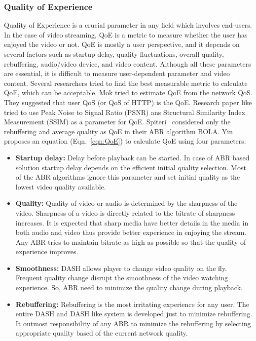 \subsubsection{Quality of Experience}
Quality of Experience is a crucial parameter in any field which involves end-users. In the case of video streaming, QoE is a metric to measure whether the user has enjoyed the video or not. QoE is mostly a user perspective, and it depends on several factors such as startup delay, quality fluctuations, overall quality, rebuffering, audio/video device, and video content. Although all these parameters are essential, it is difficult to measure user-dependent parameter and video content. Several researchers tried to find the best measurable metric to calculate QoE, which can be acceptable. Mok \etal \cite{5990550} tried to estimate QoE from the network QoS. They suggested that user QoS (or QoS of HTTP) is the QoE. Research paper like \cite{} tried to use Peak Noise to Signal Ratio (PSNR) ans Structural Similarity Index Measurement (SSIM) as a parameter for QoE. Spiteri \etal\ considered only the rebuffering and average quality as QoE in their ABR algorithm BOLA\cite{7524428}. Yin \etal\cite{10.1145/2785956.2787486} proposes an equation (Eqn.~\ref{eqn:QoE}) to calculate QoE using four parameters:
\begin{itemize}
	\item {\bf Startup delay:} Delay before playback can be started. In case of ABR based solution startup delay depends on the efficient initial quality selection. Most of the ABR algorithms ignore this parameter and set initial quality as the lowest video quality available.
	\item {\bf Quality:} Quality of video or audio is determined by the sharpness of the video. Sharpness of a video is directly related to the bitrate of sharpness increases. It is expected that sharp media have better details in the media in both audio and video thus provide better experience in enjoying the stream. Any ABR tries to maintain bitrate as high as possible so that the quality of experience improves.
	\item {\bf Smoothness:} DASH allows player to change video quality on the fly. Frequent quality change disrupt the smoothness of the video watching experience. So, ABR need to minimize the quality change during playback.
	\item {\bf Rebuffering:} Rebuffering is the most irritating experience for any user. The entire DASH and DASH like system is developed just to minimize rebuffering. It outmost responsibility of any ABR to minimize the rebuffering by selecting appropriate quality based of the current network quality.
\end{itemize}
